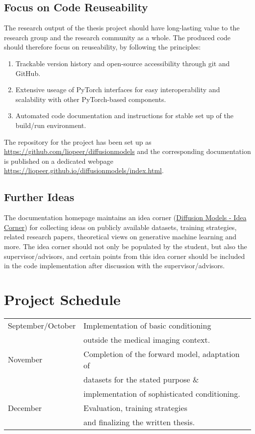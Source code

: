 \documentclass[a4paper]{article}
\begin{document}
\subsection{Focus on Code Reuseability}
The research output of the thesis project should have long-lasting value to the research group and the research community as a whole. The produced code should therefore focus on reuseability, by following the principles:
\begin{enumerate}
    \item Trackable version history and open-source accessibility through git and GitHub.
    \item Extensive useage of PyTorch interfaces for easy interoperability and scalability with other PyTorch-based components.
    \item Automated code documentation and instructions for stable set up of the build/run environment.
\end{enumerate}
The repository for the project has been set up as \url{https://github.com/liopeer/diffusionmodels} and the corresponding documentation is published on a dedicated webpage \url{https://liopeer.github.io/diffusionmodels/index.html}.

\subsection{Further Ideas}
\label{sec:ideacorner}
The documentation homepage maintains an idea corner (\href{https://liopeer.github.io/diffusionmodels/idea_corner.html}{Diffusion Models - Idea Corner}) for collecting ideas on publicly available datasets, training strategies, related research papers, theoretical views on generative machine learning and more. The idea corner should not only be populated by the student, but also the supervisor/advisors, and certain points from this idea corner should be included in the code implementation after discussion with the supervisor/advisors.

\section{Project Schedule}
\begin{tabular}{l l}
    September/October & Implementation of basic conditioning           \\ & outside the medical imaging context.                                                       \\
    November          & Completion of the forward model, adaptation of \\ & datasets for the stated purpose \& \\ & implementation of sophisticated conditioning. \\
    December          & Evaluation, training strategies                \\ & and finalizing the written thesis.
\end{tabular}
\end{document}

